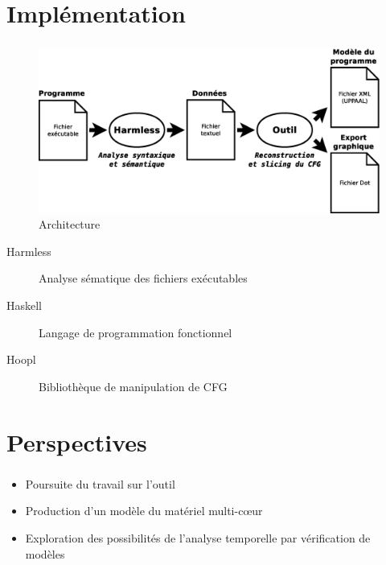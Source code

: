 \documentclass{beamer}
\begin{document}
  \section{Implémentation}
    \begin{frame}\small
      \frametitle{\secname}

      \begin{figure}
        \centering
        \includegraphics[scale=.3]{archi.eps}
        \caption{Architecture}
      \end{figure}

      \begin{description}
        \item[Harmless] Analyse sématique des fichiers exécutables
        \item[Haskell] Langage de programmation fonctionnel
        \item[Hoopl] Bibliothèque de manipulation de CFG
      \end{description}
    \end{frame}

  \section{Perspectives}
    \begin{frame}\small
      \frametitle{\secname}

      \begin{itemize}
        \item Poursuite du travail sur l'outil
        \item Production d'un modèle du matériel multi-c{\oe}ur
        \item Exploration des possibilités de l'analyse temporelle par vérification de modèles
      \end{itemize}
    \end{frame}
\end{document}
